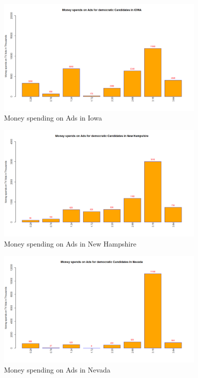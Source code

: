 \begin{figure}[H]
    \centering
    \includegraphics[width=0.9\textwidth]{figures/IOWA.png}
    \caption{Money spending on Ads in Iowa}
    \label{IOWA}
\end{figure}

\begin{figure}[H]
    \centering
    \includegraphics[width=0.9\textwidth]{figures/Newhampshire.png}
    \caption{Money spending on Ads in New Hampshire}
    \label{Newhampshire}
\end{figure}

\begin{figure}[H]
    \centering
    \includegraphics[width=0.9\textwidth]{figures/Nevada.png}
    \caption{Money spending on Ads in Nevada}
    \label{Nevada}
\end{figure}

